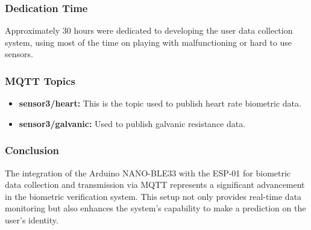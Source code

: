\subsubsection{Dedication Time}
Approximately 30 hours were dedicated to developing the user data collection system, using most of the time on playing with malfunctioning or hard to use sensors.

\subsubsection{MQTT Topics}
\begin{itemize}
    \item \textbf{sensor3/heart:} This is the topic used to publish heart rate biometric data.
    \item \textbf{sensor3/galvanic:} Used to publish galvanic resistance data.
\end{itemize}

\subsubsection{Conclusion}
The integration of the Arduino NANO-BLE33 with the ESP-01 for biometric data collection and transmission via MQTT represents a significant advancement in the biometric verification system. This setup not only provides real-time data monitoring but also enhances the system's capability to make a prediction on the user's identity.